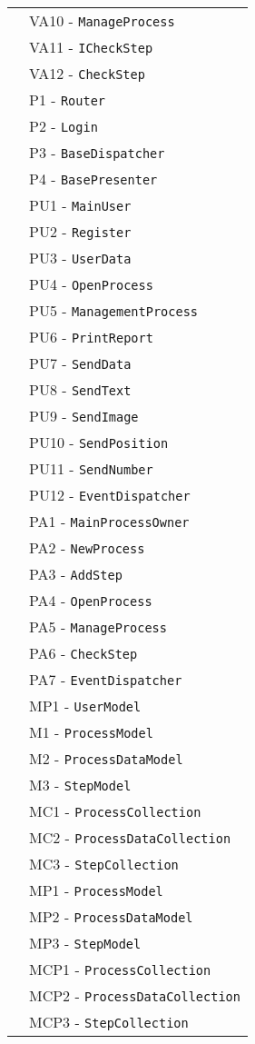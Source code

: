 \begin{longtable}{XX}
&VA10 - \texttt{ManageProcess}\\ 
&VA11 - \texttt{ICheckStep}\\ 
&VA12 - \texttt{CheckStep}\\ 
\midrule
\logic{} &P1 - \texttt{Router}\\ 
&P2 - \texttt{Login}\\ 
&P3 - \texttt{BaseDispatcher}\\
&P4 - \texttt{BasePresenter}\\  
\logicUser{}&PU1 - \texttt{MainUser}\\ 
&PU2 - \texttt{Register}\\ 
&PU3 - \texttt{UserData}\\ 
&PU4 - \texttt{OpenProcess}\\ 
&PU5 - \texttt{ManagementProcess}\\ 
&PU6 - \texttt{PrintReport}\\ 
&PU7 - \texttt{SendData}\\ 
&PU8 - \texttt{SendText}\\ 
&PU9 - \texttt{SendImage}\\ 
&PU10 - \texttt{SendPosition}\\ 
&PU11 - \texttt{SendNumber}\\
&PU12 - \texttt{EventDispatcher}\\
\midrule
\logicAdmin{}&PA1 - \texttt{MainProcessOwner}\\
&PA2 - \texttt{NewProcess}\\ 
&PA3 - \texttt{AddStep}\\ 
&PA4 - \texttt{OpenProcess}\\ 
&PA5 - \texttt{ManageProcess}\\ 
&PA6 - \texttt{CheckStep}\\ 
&PA7 - \texttt{EventDispatcher}\\ 

\midrule
\model{}&MP1 - \texttt{UserModel}\\
\midrule

\modelUser{}&M1 - \texttt{ProcessModel}\\
&M2 - \texttt{ProcessDataModel}\\
&M3 - \texttt{StepModel}\\
\midrule
\collectionu{}&MC1 - \texttt{{ProcessCollection}}\\
&MC2 - \texttt{{ProcessDataCollection}}\\
&MC3 - \texttt{{StepCollection}}\\
\midrule

\modelAdmin{}&MP1 - \texttt{ProcessModel}\\
&MP2 - \texttt{ProcessDataModel}\\
&MP3 - \texttt{StepModel}\\
\midrule
\collectionp{}&MCP1 - \texttt{{ProcessCollection}}\\
&MCP2 - \texttt{{ProcessDataCollection}}\\
&MCP3 - \texttt{{StepCollection}}\\
\midrule



\end{longtable}
